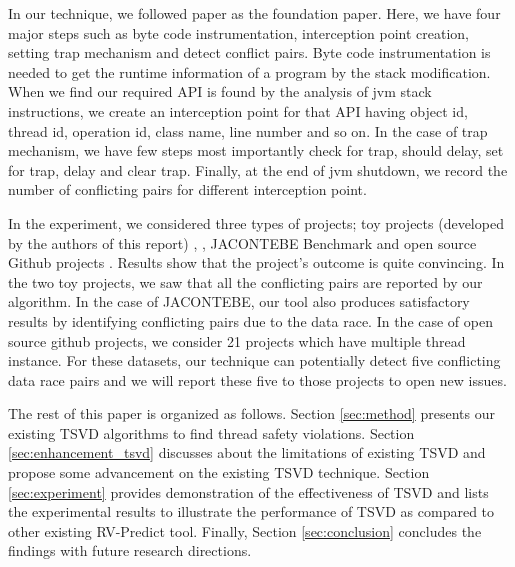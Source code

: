In our technique, we followed \cite{li2019efficient} paper as the foundation
paper. Here, we have four major steps such as byte code instrumentation,
interception point creation, setting trap mechanism and detect conflict pairs.
Byte code instrumentation is needed to get the runtime information of a program
by the stack modification. When we find our required API is found by the
analysis of jvm stack instructions, we create an interception point for that
API having object id, thread id, operation id, class name, line number and so
on. In the case of trap mechanism, we have few steps most importantly check for
trap, should delay, set for trap, delay and clear trap. Finally, at the end of
jvm shutdown, we record the number of conflicting pairs for different
interception point.

In the experiment, we considered three types of projects; toy projects
(developed by the authors of this report) \cite{toy_project_1},
\cite{toy_project_2}, JACONTEBE Benchmark \cite{lin2015jacontebe} and open
source Github projects \cite{githubProjects}. Results show that the project's
outcome is quite convincing. In the two toy projects, we saw that all the
conflicting pairs are reported by our algorithm. In the case of JACONTEBE, our
tool also produces satisfactory results by identifying conflicting pairs due to
the data race. In the case of open source github projects, we consider 21
projects which have multiple thread instance. For these datasets,  our technique
can potentially detect five conflicting data race pairs and we will report
these five to those projects to open new issues.


The rest of this paper is organized as follows. Section \ref{sec:method}
presents our existing TSVD algorithms to find thread safety violations. Section
\ref{sec:enhancement_tsvd} discusses about the limitations of existing TSVD and
propose some advancement on the existing TSVD technique. Section
\ref{sec:experiment} provides demonstration of the effectiveness of TSVD and
lists the experimental results to illustrate the performance of TSVD as
compared to other existing RV-Predict tool. Finally, Section
\ref{sec:conclusion} concludes the findings with future research directions.






